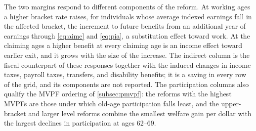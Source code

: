 The two margins respond to different components of the reform. At working ages a higher bracket rate raises, for individuals whose average indexed earnings fall in the affected bracket, the increment to future benefits from an additional year of earnings through \eqref{eq:aime} and \eqref{eq:pia}, a substitution effect toward work. At the claiming ages a higher benefit at every claiming age is an income effect toward earlier exit, and it grows with the size of the increase. The indirect column is the fiscal counterpart of these responses together with the induced changes in income taxes, payroll taxes, transfers, and disability benefits; it is a saving in every row of the grid, and its components are not reported. %
The participation columns also qualify the MVPF ordering of \autoref{subsec:pmvpf}: the reforms with the highest MVPFs are those under which old-age participation falls least, and the upper-bracket and larger level reforms combine the smallest welfare gain per dollar with the largest declines in participation at ages 62--69. %
